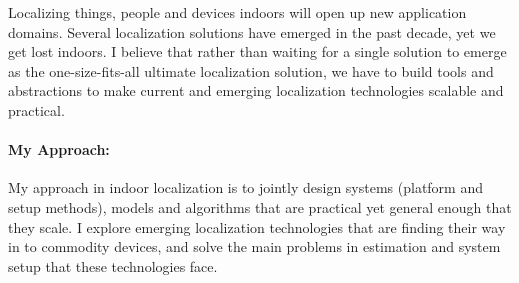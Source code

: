 \documentclass[11pt]{article}
\begin{document}




Localizing things, people and devices indoors will open up new application domains. %
Several localization solutions have emerged in the past decade, yet we get lost indoors. 
I believe that rather than waiting for a single solution to emerge as the one-size-fits-all ultimate localization solution, we have to build tools and abstractions to make current and emerging localization technologies scalable and practical. %

\paragraph{My Approach: }My approach in indoor localization is to jointly design systems (platform and setup methods), models and algorithms that are practical yet general enough that they scale. I explore emerging localization technologies that are finding their way in to commodity devices, and solve the main problems in estimation and system setup that these technologies face. 
\end{document}
